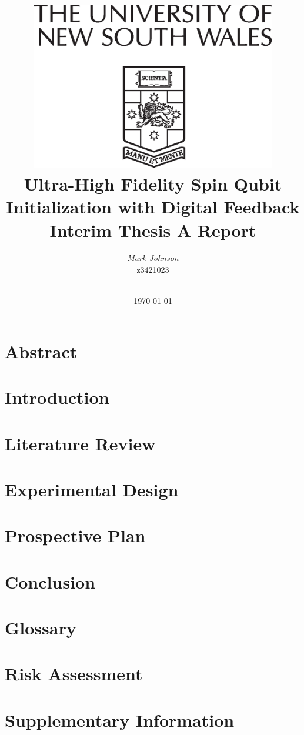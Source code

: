 \documentclass[a4paper, english, twoside, 12pt]{article}
\title{
	\centering\includegraphics[width=0.8\textwidth]{Arms-vl}\\
	\vspace{1cm}
	\Huge \textbf{Ultra-High Fidelity Spin Qubit Initialization with Digital Feedback}\\
	\vspace{1cm}
    \huge Interim Thesis A Report
	}
\author{\Huge \emph{Mark Johnson}\\
        \Large z3421023 \\\\ 
        }
\date{\today} %
\begin{document}
%
%

\thispagestyle{empty}

\pagebreak


\listoftodos

\pagebreak

\tableofcontents
\listoffigures
\listoftables

\pagebreak

\section{Abstract}

\pagebreak
\section{Introduction}

\pagebreak
\section{Literature Review}

\pagebreak
\section{Experimental Design}

\pagebreak
\section{Prospective Plan}

\pagebreak
\section{Conclusion}

\pagebreak


\begin{appendices} 
	\section{Glossary}
	\printglossaries
	\section{Risk Assessment}
	
	\section{Supplementary Information}
	
	
\end{appendices}
\end{document}
